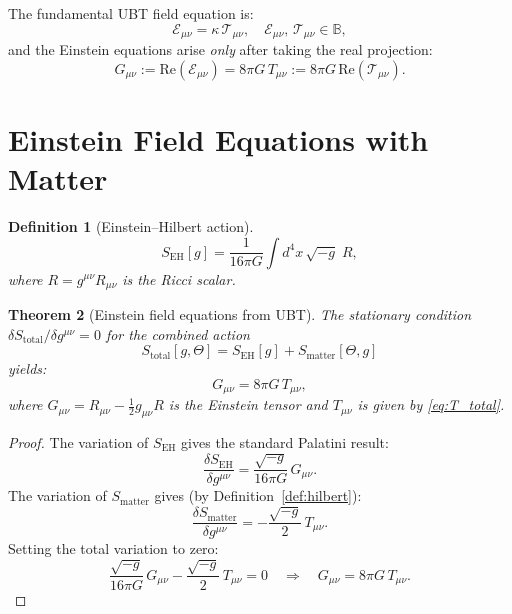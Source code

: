\documentclass[12pt]{article}
\newtheorem{definition}{Definition}[section]
\newtheorem{theorem}[definition]{Theorem}
\newcommand{\B}{\mathbb{B}}
\newcommand{\re}{\mathrm{Re}}
\newcommand{\calT}{\mathcal{T}}
\newcommand{\calE}{\mathcal{E}}
\begin{document}
The fundamental UBT field equation is:
\begin{equation}
  \calE_{\mu\nu} = \kappa\,\calT_{\mu\nu},
  \quad
  \calE_{\mu\nu},\,\calT_{\mu\nu} \in \B,
\end{equation}
and the Einstein equations arise \emph{only} after taking the real projection:
\begin{equation}
  G_{\mu\nu} := \re(\calE_{\mu\nu}) = 8\pi G\,T_{\mu\nu} := 8\pi G\,\re(\calT_{\mu\nu}).
\end{equation}

\section{Einstein Field Equations with Matter}
\label{sec:einstein}

\begin{definition}[Einstein--Hilbert action]
\label{def:EH}
\begin{equation}
  \label{eq:S_EH}
  S_{\mathrm{EH}}[g] = \frac{1}{16\pi G}\int d^4x\,\sqrt{-g}\; R,
\end{equation}
where $R = g^{\mu\nu}R_{\mu\nu}$ is the Ricci scalar.
\end{definition}

\begin{theorem}[Einstein field equations from UBT]
\label{thm:einstein}
The stationary condition $\delta S_{\mathrm{total}}/\delta g^{\mu\nu} = 0$
for the combined action
\begin{equation}
  S_{\mathrm{total}}[g,\Theta]
  = S_{\mathrm{EH}}[g] + S_{\mathrm{matter}}[\Theta, g]
\end{equation}
yields:
\begin{equation}
  \label{eq:einstein_matter}
  \boxed{G_{\mu\nu} = 8\pi G\,T_{\mu\nu},}
\end{equation}
where $G_{\mu\nu} = R_{\mu\nu} - \tfrac{1}{2}g_{\mu\nu}R$ is the Einstein
tensor and $T_{\mu\nu}$ is given by \eqref{eq:T_total}.
\end{theorem}

\begin{proof}
The variation of $S_{\mathrm{EH}}$ gives the standard Palatini result:
\begin{equation}
  \frac{\delta S_{\mathrm{EH}}}{\delta g^{\mu\nu}}
  = \frac{\sqrt{-g}}{16\pi G}\,G_{\mu\nu}.
\end{equation}
The variation of $S_{\mathrm{matter}}$ gives (by Definition~\ref{def:hilbert}):
\begin{equation}
  \frac{\delta S_{\mathrm{matter}}}{\delta g^{\mu\nu}}
  = -\frac{\sqrt{-g}}{2}\,T_{\mu\nu}.
\end{equation}
Setting the total variation to zero:
\begin{equation}
  \frac{\sqrt{-g}}{16\pi G}\,G_{\mu\nu}
  - \frac{\sqrt{-g}}{2}\,T_{\mu\nu} = 0
  \quad\Longrightarrow\quad
  G_{\mu\nu} = 8\pi G\,T_{\mu\nu}.
\end{equation}
\end{proof}
\end{document}
